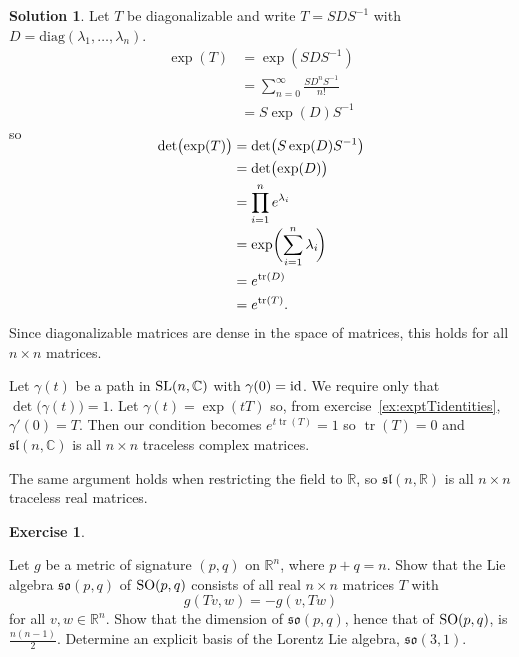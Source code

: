 \documentclass[11pt, a4paper]{report}
\theoremstyle{definition}
\newtheorem{exercise}{Exercise}[part]
\newtheorem{solution}{Solution}[part]
\newenvironment{ex}{\begin{exercise}}{\end{exercise}\pagebreak[1]}
\newenvironment{sol}{\begin{solution}}{\end{solution}\pagebreak[3]}
\newcommand*{\SL}{\ensuremath\text{SL}}
\newcommand*{\SO}{\ensuremath\text{SO}}
\newcommand*{\op}[1]{\ensuremath\mathop{}\mathopen{}#1}
\DeclareMathOperator{\tr}{tr}
\newcommand*{\id}{\op{\mathrm{id}}}
\begin{document}
\begin{sol}

Let $T$ be diagonalizable and write $T = SDS^{-1}$ with $D = \mathrm{diag}(\lambda_1, \ldots, \lambda_n)$.
\begin{align*}
    \exp(T) &= \exp(SDS^{-1}) \\
            &= \sum_{n = 0}^\infty \frac{S D^n S^{-1}}{n!} \\
            &= S \exp(D) S^{-1}
\end{align*}
so
\begin{align*}
    \SwapAboveDisplaySkip
    \det\bigl(\exp(T)\bigr) &= \det\bigl(S \exp(D) S^{-1} \bigr) \\
        &= \det\bigl(\exp(D)\bigr) \\
        &= \prod_{i = 1}^n e^{\lambda_i} \\[-1\jot]
        &= \exp \biggl(\sum_{i = 1}^n \lambda_i \! \biggr) \\
        &= e^{\tr(D)} \\
        &= e^{\tr(T)}.
\end{align*}
Since diagonalizable matrices are dense in the space of matrices, this holds for all $n \times n$ matrices.

Let $\gamma(t)$ be a path in $\SL(n, \mathbb{C})$ with $\gamma(0) = \id$. We require only that $\det\bigl(\gamma(t)\bigr) = 1$.
Let $\gamma(t) = \exp(tT)$ so, from exercise~\ref{ex:exptTidentities}, $\gamma'(0) = T$. Then our condition becomes $e^{t \tr(T)} = 1$ so $\tr(T) = 0$ and $\mathfrak{sl}(n, \mathbb{C})$ is all $n \times n$ traceless complex matrices.

The same argument holds when restricting the field to $\mathbb{R}$, so $\mathfrak{sl}(n, \mathbb{R})$ is all $n \times n$ traceless real matrices.

\end{sol}

\begin{ex}\label{ex:lorentzliealgebra}

Let $g$ be a metric of signature $(p, q)$ on $\mathbb{R}^n$, where $p + q = n$.
Show that the Lie algebra $\mathfrak{so}(p, q)$ of $\SO(p, q)$ consists of all real $n \times n$ matrices $T$ with
\[
    g(Tv, w) = -g(v, Tw)
\]
for all $v, w \in \mathbb{R}^n$.
Show that the dimension of $\mathfrak{so}(p, q)$, hence that of $\SO(p, q)$, is $\frac{n(n - 1)}{2}$.
Determine an explicit basis of the Lorentz Lie algebra, $\mathfrak{so}(3, 1)$.

\end{ex}
\end{document}
